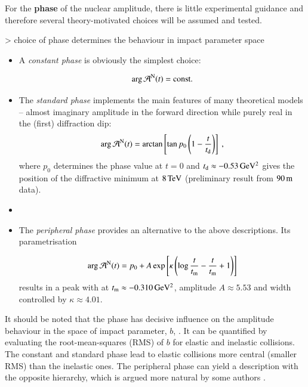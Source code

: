 For the {\bf phase} of the nuclear amplitude, there is little experimental guidance and therefore several theory-motivated choices will be assumed and tested.

\>> choice of phase determines the behaviour in impact parameter space

\begin{itemize}

\item A {\it constant phase} is obviously the simplest choice:

\begin{equation}
\label{eq:nuc phase const}
\arg {\cal A}^{\rm N}(t) = \hbox{const.}
\end{equation}

\item The {\it standard phase} \cite{bailly87}  implements the main features of many theoretical models -- almost imaginary amplitude in the forward direction while purely real in the (first) diffraction dip:
\begin{equation}
\label{eq:nuc phase std}
	\arg {\cal A}^{\rm N}(t) = \arctan \left[ \tan p_0 \left(1 - {t\over t_{\rm d}} \right) \right]\ ,
\end{equation}
where $p_0$ determines the phase value at $t=0$ and $t_{\rm d} \approx -0.53\,{\rm GeV^2}$ gives the position of the diffractive minimum at $8\,{\rm TeV}$ (preliminary result from $90\,{\rm m}$ data).

\item {}

\item The {\it peripheral phase} \cite{kl94}  provides an alternative to the above descriptions. Its parametrisation

\begin{equation}
\label{eq:nuc phase per}
\arg {\cal A}^{\rm N}(t) = p_0 + A \exp\left[ \kappa \left( \log {t\over t_{\rm m}} - {t\over t_{\rm m}} + 1 \right) \right]
\end{equation}
results in a peak with at $t_{\rm m} \approx -0.310\,{\rm GeV^2}$, amplitude $A \approx 5.53$ and width controlled by $\kappa \approx 4.01$.

\end{itemize}

It should be noted that the phase has decisive influence on the amplitude behaviour in the space of impact parameter, $b$, \cite{klk02}. It can be quantified by evaluating the root-mean-squares (RMS) of $b$ for elastic and inelastic collisions. The constant and standard phase lead to elastic collisions more central (smaller RMS) than the inelastic ones. The peripheral phase can yield a description with the opposite hierarchy, which is argued more natural by some authors \cite{kl96}.

